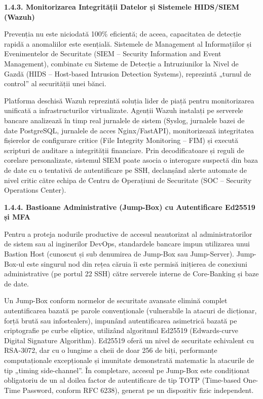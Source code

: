 \documentclass[
]{article}
\begin{document}
\textbf{1.4.3. Monitorizarea Integrității Datelor și Sistemele HIDS/SIEM
(Wazuh)}

Prevenția nu este niciodată 100\% eficientă; de aceea, capacitatea de
detecție rapidă a anomaliilor este esențială. Sistemele de Management al
Informațiilor și Evenimentelor de Securitate (SIEM -- Security
Information and Event Management), combinate cu Sisteme de Detecție a
Intruziunilor la Nivel de Gazdă (HIDS -- Host-based Intrusion Detection
Systems), reprezintă „turnul de control'' al securității unei bănci.

Platforma deschisă Wazuh reprezintă soluția lider de piață pentru
monitorizarea unificată a infrastructurilor virtualizate. Agenții Wazuh
instalați pe serverele bancare analizează în timp real jurnalele de
sistem (Syslog, jurnalele bazei de date PostgreSQL, jurnalele de acces
Nginx/FastAPI), monitorizează integritatea fișierelor de configurare
critice (File Integrity Monitoring -- FIM) și execută scripturi de
auditare a integrității financiare. Prin decodificatoare și reguli de
corelare personalizate, sistemul SIEM poate asocia o interogare suspectă
din baza de date cu o tentativă de autentificare pe SSH, declanșând
alerte automate de nivel critic către echipa de Centru de Operațiuni de
Securitate (SOC -- Security Operations Center).

\textbf{1.4.4. Bastioane Administrative (Jump-Box) cu Autentificare
Ed25519 și MFA}

Pentru a proteja nodurile productive de accesul neautorizat al
administratorilor de sistem sau al inginerilor DevOps, standardele
bancare impun utilizarea unui Bastion Host (cunoscut și sub denumirea de
Jump-Box sau Jump-Server). Jump-Box-ul este singurul nod din rețea
căruia îi este permisă inițierea de conexiuni administrative (pe portul
22 SSH) către serverele interne de Core-Banking și baze de date.

Un Jump-Box conform normelor de securitate avansate elimină complet
autentificarea bazată pe parole convenționale (vulnerabile la atacuri de
dicționar, forță brută sau infostealers), impunând autentificarea
asimetrică bazată pe criptografie pe curbe eliptice, utilizând
algoritmul Ed25519 (Edwards-curve Digital Signature Algorithm). Ed25519
oferă un nivel de securitate echivalent cu RSA-3072, dar cu o lungime a
cheii de doar 256 de biți, performanțe computaționale excepționale și
imunitate demonstrată matematic la atacurile de tip „timing
side-channel''. În completare, accesul pe Jump-Box este condiționat
obligatoriu de un al doilea factor de autentificare de tip TOTP
(Time-based One-Time Password, conform RFC 6238), generat pe un
dispozitiv fizic independent.
\end{document}

